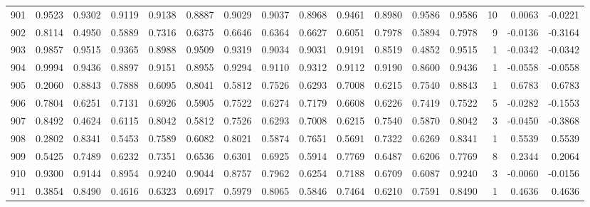 \begin{tabular}{lrrrrrrrrrrrrrrr}
901 &      0.9523 &  0.9302 &  0.9119 &  0.9138 &  0.8887 &  0.9029 &  0.9037 &  0.8968 &  0.9461 &  0.8980 &   0.9586 &     0.9586 &     10 &                    0.0063 &                    -0.0221 \\
902 &      0.8114 &  0.4950 &  0.5889 &  0.7316 &  0.6375 &  0.6646 &  0.6364 &  0.6627 &  0.6051 &  0.7978 &   0.5894 &     0.7978 &      9 &                   -0.0136 &                    -0.3164 \\
903 &      0.9857 &  0.9515 &  0.9365 &  0.8988 &  0.9509 &  0.9319 &  0.9034 &  0.9031 &  0.9191 &  0.8519 &   0.4852 &     0.9515 &      1 &                   -0.0342 &                    -0.0342 \\
904 &      0.9994 &  0.9436 &  0.8897 &  0.9151 &  0.8955 &  0.9294 &  0.9110 &  0.9312 &  0.9112 &  0.9190 &   0.8600 &     0.9436 &      1 &                   -0.0558 &                    -0.0558 \\
905 &      0.2060 &  0.8843 &  0.7888 &  0.6095 &  0.8041 &  0.5812 &  0.7526 &  0.6293 &  0.7008 &  0.6215 &   0.7540 &     0.8843 &      1 &                    0.6783 &                     0.6783 \\
906 &      0.7804 &  0.6251 &  0.7131 &  0.6926 &  0.5905 &  0.7522 &  0.6274 &  0.7179 &  0.6608 &  0.6226 &   0.7419 &     0.7522 &      5 &                   -0.0282 &                    -0.1553 \\
907 &      0.8492 &  0.4624 &  0.6115 &  0.8042 &  0.5812 &  0.7526 &  0.6293 &  0.7008 &  0.6215 &  0.7540 &   0.5870 &     0.8042 &      3 &                   -0.0450 &                    -0.3868 \\
908 &      0.2802 &  0.8341 &  0.5453 &  0.7589 &  0.6082 &  0.8021 &  0.5874 &  0.7651 &  0.5691 &  0.7322 &   0.6269 &     0.8341 &      1 &                    0.5539 &                     0.5539 \\
909 &      0.5425 &  0.7489 &  0.6232 &  0.7351 &  0.6536 &  0.6301 &  0.6925 &  0.5914 &  0.7769 &  0.6487 &   0.6206 &     0.7769 &      8 &                    0.2344 &                     0.2064 \\
910 &      0.9300 &  0.9144 &  0.8954 &  0.9240 &  0.9044 &  0.8757 &  0.7962 &  0.6254 &  0.7188 &  0.6709 &   0.6087 &     0.9240 &      3 &                   -0.0060 &                    -0.0156 \\
911 &      0.3854 &  0.8490 &  0.4616 &  0.6323 &  0.6917 &  0.5979 &  0.8065 &  0.5846 &  0.7464 &  0.6210 &   0.7591 &     0.8490 &      1 &                    0.4636 &                     0.4636 \\

\end{tabular}
